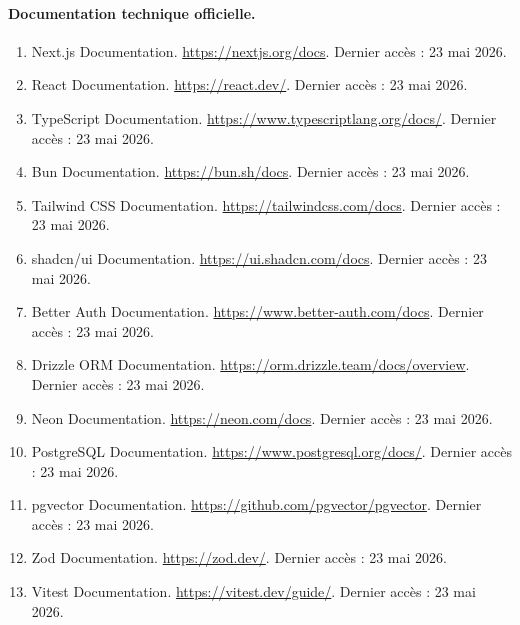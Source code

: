 \paragraph{Documentation technique officielle.}
\begin{enumerate}[resume]
  \item\label{web:nextjs-docs} Next.js Documentation. \url{https://nextjs.org/docs}. Dernier accès : 23 mai 2026.
  \item\label{web:react-docs} React Documentation. \url{https://react.dev/}. Dernier accès : 23 mai 2026.
  \item\label{web:typescript-docs} TypeScript Documentation. \url{https://www.typescriptlang.org/docs/}. Dernier accès : 23 mai 2026.
  \item\label{web:bun-docs} Bun Documentation. \url{https://bun.sh/docs}. Dernier accès : 23 mai 2026.
  \item\label{web:tailwind-docs} Tailwind CSS Documentation. \url{https://tailwindcss.com/docs}. Dernier accès : 23 mai 2026.
  \item\label{web:shadcn-docs} shadcn/ui Documentation. \url{https://ui.shadcn.com/docs}. Dernier accès : 23 mai 2026.
  \item\label{web:better-auth-docs} Better Auth Documentation. \url{https://www.better-auth.com/docs}. Dernier accès : 23 mai 2026.
  \item\label{web:drizzle-docs} Drizzle ORM Documentation. \url{https://orm.drizzle.team/docs/overview}. Dernier accès : 23 mai 2026.
  \item\label{web:neon-docs} Neon Documentation. \url{https://neon.com/docs}. Dernier accès : 23 mai 2026.
  \item\label{web:postgres-docs} PostgreSQL Documentation. \url{https://www.postgresql.org/docs/}. Dernier accès : 23 mai 2026.
  \item\label{web:pgvector-docs} pgvector Documentation. \url{https://github.com/pgvector/pgvector}. Dernier accès : 23 mai 2026.
  \item\label{web:zod-docs} Zod Documentation. \url{https://zod.dev/}. Dernier accès : 23 mai 2026.
  \item\label{web:vitest-docs} Vitest Documentation. \url{https://vitest.dev/guide/}. Dernier accès : 23 mai 2026.
\end{enumerate}

